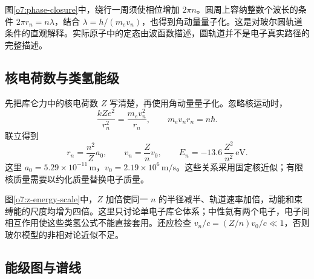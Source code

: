 图\ref{o7:phase-closure}中，绕行一周须使相位增加 $2\pi n$。圆周上容纳整数个波长的条件 $2\pi r_n=n\lambda$，结合 \(\lambda=h/(m_ev_n)\)，也得到角动量量子化。这是对玻尔圆轨道条件的直观解释。实际原子中的定态由波函数描述，圆轨道并不是电子真实路径的完整描述。

\subsection{核电荷数与类氢能级}
先把库仑力中的核电荷数 \(Z\) 写清楚，再使用角动量量子化。忽略核运动时，
\[
 \frac{kZe^2}{r_n^2}=\frac{m_ev_n^2}{r_n},\qquad
 m_ev_nr_n=n\hbar.
\]
联立得到
\[
 r_n=\frac{n^2}{Z}a_0,\qquad v_n=\frac Zn v_0,\qquad
 E_n=-13.6\,\frac{Z^2}{n^2}\,\mathrm{eV}.
\]
这里 \(a_0=5.29\times10^{-11}\,\mathrm m\)，\(v_0=2.19\times10^6\,\mathrm{m/s}\)。这些关系采用固定核近似；有限核质量需要以约化质量替换电子质量。

图\ref{o7:z-energy-scale}中，$Z$ 加倍使同一 $n$ 的半径减半、轨道速率加倍，动能和束缚能的尺度均增为四倍。这里只讨论单电子库仑体系；中性氦有两个电子，电子间相互作用使这些类氢公式不能直接套用。还应检查 $v_n/c=(Z/n)v_0/c\ll1$，否则玻尔模型的非相对论近似不足。

\subsection{能级图与谱线}

